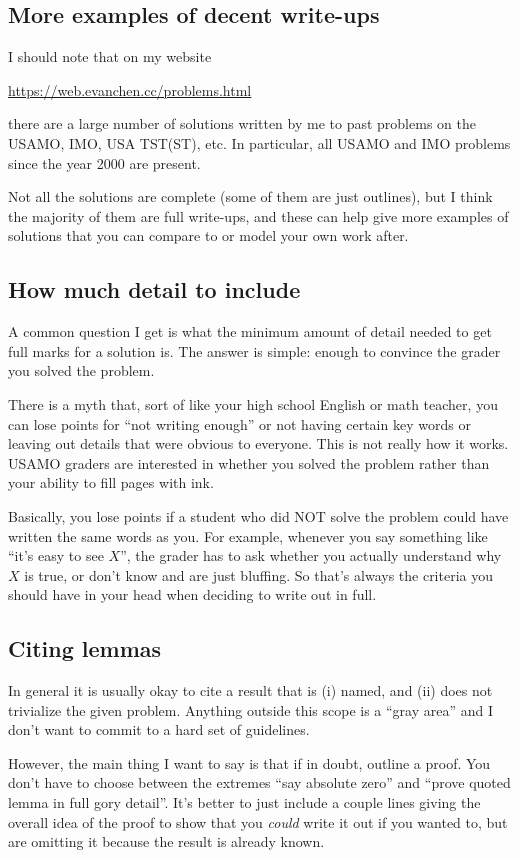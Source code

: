 \documentclass[11pt]{scrartcl}
\begin{document}
\subsection{More examples of decent write-ups}
I should note that on my website
\begin{center}
  \url{https://web.evanchen.cc/problems.html}
\end{center}
there are a large number of solutions written by me
to past problems on the USAMO, IMO, USA TST(ST), etc.
In particular, all USAMO and IMO problems since the year 2000
are present.

Not all the solutions are complete (some of them are just outlines),
but I think the majority of them are full write-ups,
and these can help give more examples of solutions
that you can compare to or model your own work after.

\subsection{How much detail to include}
A common question I get is what the minimum amount of detail needed
to get full marks for a solution is.
The answer is simple: enough to convince the grader you solved the problem.

There is a myth that, sort of like your high school English or math teacher,
you can lose points for ``not writing enough'' or not having certain key words
or leaving out details that were obvious to everyone.
This is not really how it works.
USAMO graders are interested in whether you solved the problem
rather than your ability to fill pages with ink.

Basically, \alert{you lose points if a student who did NOT solve the problem
could have written the same words as you}.
For example, whenever you say something like ``it's easy to see $X$'',
the grader has to ask whether you actually understand why $X$ is true,
or don't know and are just bluffing.
So that's always the criteria you should have in your head
when deciding to write out in full.

\subsection{Citing lemmas}
In general it is usually okay to cite a result that is
(i) named, and (ii) does not trivialize the given problem.
Anything outside this scope is a ``gray area''
and I don't want to commit to a hard set of guidelines.

However, the main thing I want to say is that
\alert{if in doubt, outline a proof}.
You don't have to choose between the extremes
``say absolute zero'' and ``prove quoted lemma in full gory detail''.
It's better to just include a couple lines giving the overall idea of the proof
to show that you \emph{could} write it out if you wanted to,
but are omitting it because the result is already known.
\end{document}
